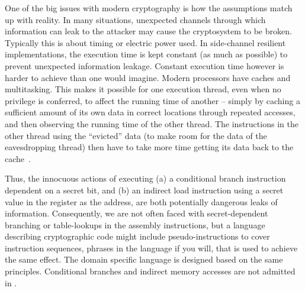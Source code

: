 
One of the big issues with modern cryptography is how the assumptions
match up with reality. In many situations, unexpected channels
through which information can leak to the attacker may cause the
cryptosystem to be broken. Typically this is about timing or
electric power used.
In side-channel resilient implementations, the execution time
is kept constant (as much as possible) to prevent unexpected
information leakage.
Constant execution time however is harder to achieve than one would imagine.
Modern processors have caches
and multitasking. This makes it possible for one execution
thread, even when no privilege is conferred, to affect the running
time of another -- simply by caching a sufficient amount of its own
data in correct locations through repeated accesses, and then
observing the running time of the other thread. The instructions in
the other thread using the ``evicted'' data (to make room for the
data of the eavesdropping thread) then have to take more time getting
its data back to the cache~\cite{B:05:CTAA}.



Thus, the innocuous actions of executing (a) a conditional
branch instruction dependent on a secret bit, and (b) an
indirect load instruction using a secret value in the register as the
address, are both potentially dangerous leaks of information.
Consequently, we are not often
faced with secret-dependent branching or table-lookups in the assembly
instructions, but a language describing cryptographic code might
include pseudo-instructions to cover instruction sequences, phrases in
the language if you will, that is used to achieve the same effect.
The domain specific language \bvdsl is designed based on the same
principles. Conditional branches and indirect memory accesses are not
admitted in \bvdsl.

